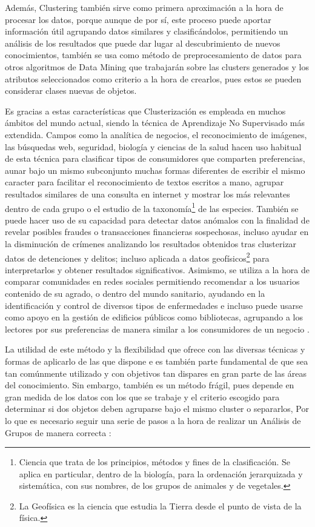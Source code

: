 \documentclass[3p,twocolumn]{elsarticle}
\begin{document}
Además, Clustering también sirve como primera aproximación a la hora de procesar los datos, porque aunque de por sí, este proceso puede aportar información útil agrupando datos similares y clasificándolos, permitiendo un análisis de los resultados que puede dar lugar al descubrimiento de nuevos conocimientos, también se usa como método de preprocesamiento de datos para otros algoritmos de Data Mining que trabajarán sobre las clusters generados y los atributos seleccionados como criterio a la hora de crearlos, pues estos se pueden considerar clases nuevas de objetos.

Es gracias a estas características que Clusterización es empleada en muchos ámbitos del mundo actual, siendo la técnica de Aprendizaje No Supervisado más extendida. Campos como la analítica de negocios, el reconocimiento de imágenes, las búsquedas web, seguridad, biología y ciencias de la salud hacen uso habitual de esta técnica para clasificar tipos de consumidores que comparten preferencias, aunar bajo un mismo subconjunto muchas formas diferentes de escribir el mismo caracter para facilitar el reconocimiento de textos escritos a mano, agrupar resultados similares de una consulta en internet y mostrar los más relevantes dentro de cada grupo o el estudio de la taxonomía\footnote{Ciencia que trata de los principios, métodos y fines de la clasificación. Se aplica en particular, dentro de la biología, para la ordenación jerarquizada y sistemática, con sus nombres, de los grupos de animales y de vegetales.} de las especies. También se puede hacer uso de su capacidad para detectar datos anómalos con la finalidad de revelar posibles fraudes o transacciones  financieras sospechosas, incluso ayudar en la disminución de crímenes analizando los resultados obtenidos tras clusterizar datos de detenciones y delitos; incluso aplicada a datos geofísicos\footnote{La Geofísica es la ciencia que estudia la Tierra desde el punto de vista de la física.} para interpretarlos y obtener resultados significativos. Asimismo, se utiliza a la hora de comparar comunidades en redes sociales permitiendo recomendar a los usuarios contenido de su agrado, o dentro del mundo sanitario, ayudando en la identificación y control de diversos tipos de enfermedades e incluso puede usarse como apoyo en la gestión de edificios públicos como bibliotecas, agrupando a los lectores por sus preferencias de manera similar a los consumidores de un negocio \cite{9,10,11,12,13}.

La utilidad de este método y la flexibilidad que ofrece con las diversas técnicas y formas de aplicarlo de las que dispone e es también parte fundamental de que sea tan comúnmente utilizado y con objetivos tan dispares en gran parte de las áreas del conocimiento. Sin embargo, también es un método frágil, pues depende en gran medida de los datos con los que se trabaje y el criterio escogido para determinar si dos objetos deben agruparse bajo el mismo cluster o separarlos, Por lo que es necesario seguir una serie de pasos a la hora de realizar un Análisis de Grupos de manera correcta \cite{14}:
\end{document}
